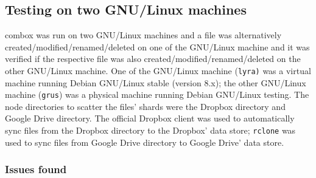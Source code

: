 \subsection{Testing on two GNU/Linux machines}

combox was run on two GNU/Linux machines and a file was alternatively
created/modified/renamed/deleted on one of the GNU/Linux machine and
it was verified if the respective file was also
created/modified/renamed/deleted on the other GNU/Linux machine. One
of the GNU/Linux machine (\verb+lyra)+ was a virtual machine running
Debian GNU/Linux stable (version 8.x); the other GNU/Linux machine
(\verb+grus+) was a physical machine running Debian GNU/Linux
testing. The node directories to scatter the files' shards were the
Dropbox directory and Google Drive directory. The official Dropbox
client was used to automatically sync files from the Dropbox directory
to the Dropbox' data store; \verb+rclone+\cite{program:rclone} was
used to sync files from Google Drive directory to Google Drive'
data store.

\subsubsection{Issues found}\label{ch-4-2gnus-issues}

